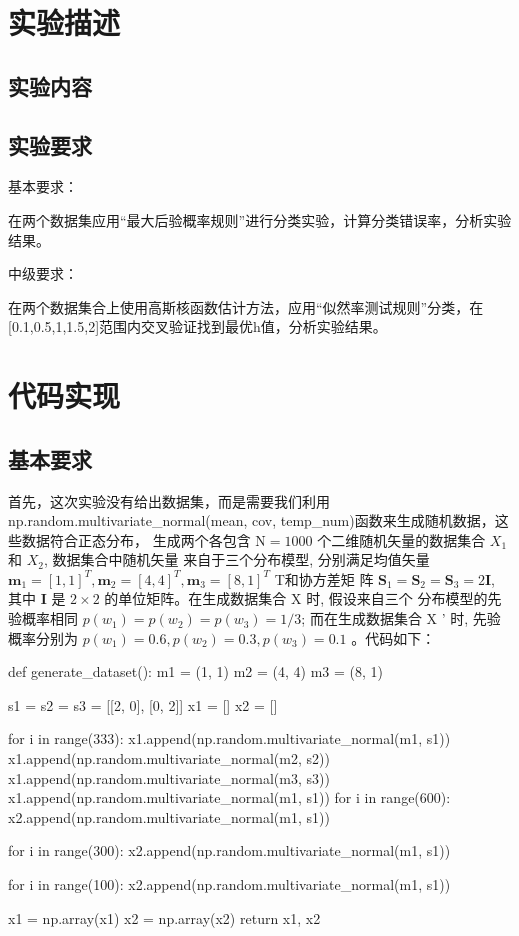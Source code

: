 \documentclass[UTF8,a4paper,10pt]{ctexart}
\begin{document}
\section{实验描述}
\subsection{实验内容}

\subsection{实验要求}
基本要求：

在两个数据集应用“最大后验概率规则”进行分类实验，计算分类错误率，分析实验结果。

中级要求：

在两个数据集合上使用高斯核函数估计方法，应用“似然率测试规则”分类，在[0.1,0.5,1,1.5,2]范围内交叉验证找到最优h值，分析实验结果。
\section{代码实现}

\subsection{基本要求}
首先，这次实验没有给出数据集，而是需要我们利用np.random.multivariate\_normal(mean, cov, temp\_num)函数来生成随机数据，这些数据符合正态分布，
生成两个各包含 $\mathrm{N}=1000$ 个二维随机矢量的数据集合 $X_{1}$ 和 $X_{2}$, 数据集合中随机矢量 来自于三个分布模型, 分别满足均值矢量 $\mathbf{m}_{1}=[1,1]^{T}, \mathbf{m}_{2}=[4,4]^{T}, \mathbf{m}_{3}=[8,1]^{T}$ T和协方差矩 阵 $\mathbf{S}_{1}=\mathbf{S}_{2}=\mathbf{S}_{3}=2 \mathbf{I}$, 其中 $\mathbf{I}$ 是 $2 \times 2$ 的单位矩阵。在生成数据集合 $\mathrm{X}$ 时, 假设来自三个 分布模型的先验概率相同 $p\left(w_{1}\right)=p\left(w_{2}\right)=p\left(w_{3}\right)=1 / 3$; 而在生成数据集合 $\mathrm{X}$ ' 时, 先验 概率分别为 $p\left(w_{1}\right)=0.6, p\left(w_{2}\right)=0.3, p\left(w_{3}\right)=0.1$ 。代码如下：

\begin{python}
def generate_dataset():
   m1 = (1, 1)
   m2 = (4, 4)
   m3 = (8, 1)

   s1 = s2 = s3 = [[2, 0], [0, 2]]
   x1 = []
   x2 = []

   for i in range(333):
       x1.append(np.random.multivariate_normal(m1, s1))
       x1.append(np.random.multivariate_normal(m2, s2))
       x1.append(np.random.multivariate_normal(m3, s3))
   x1.append(np.random.multivariate_normal(m1, s1))
   for i in range(600):
       x2.append(np.random.multivariate_normal(m1, s1))

   for i in range(300):
       x2.append(np.random.multivariate_normal(m1, s1))

   for i in range(100):
       x2.append(np.random.multivariate_normal(m1, s1))

   x1 = np.array(x1)
   x2 = np.array(x2)
   return x1, x2

\end{python}
\end{document}
